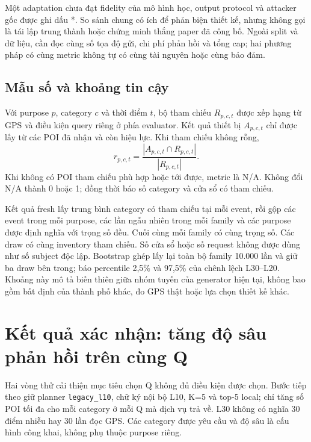 Một adaptation chưa đạt fidelity của mô hình học, output protocol và attacker
gốc được ghi dấu *. So sánh chung có ích để phản biện thiết kế, nhưng không
gọi là tái lập trung thành hoặc chứng minh thắng paper đã công bố. Ngoài split
và dữ liệu, cần đọc cùng số tọa độ gửi, chi phí phản hồi và tổng cap; hai
phương pháp có cùng metric không tự có cùng tài nguyên hoặc cùng bảo đảm.

\subsection{Mẫu số và khoảng tin cậy}

Với purpose $p$, category $c$ và thời điểm $t$, bộ tham chiếu $R_{p,c,t}$ được
xếp hạng từ GPS và điều kiện query riêng ở phía evaluator. Kết quả thiết bị
$A_{p,c,t}$ chỉ được lấy từ các POI đã nhận và còn hiệu lực. Khi tham chiếu
không rỗng,
\begin{equation}
 r_{p,c,t}=\frac{|A_{p,c,t}\cap R_{p,c,t}|}{|R_{p,c,t}|}.
 \label{eq:current-conditional-recall}
\end{equation}
Khi không có POI tham chiếu phù hợp hoặc tới được, metric là N/A. Không đổi
N/A thành 0 hoặc 1; đồng thời báo số category và cửa sổ có tham chiếu.

Kết quả fresh lấy trung bình category có tham chiếu tại mỗi event, rồi gộp các
event trong mỗi purpose, các lần ngẫu nhiên trong mỗi family và các purpose
được định nghĩa với trọng số đều. Cuối cùng mỗi family có cùng trọng số.
Các draw có cùng inventory tham chiếu. Số cửa sổ hoặc số request không được
dùng như số subject độc lập. Bootstrap ghép lấy lại toàn bộ family 10.000 lần
và giữ ba draw bên trong; báo percentile 2,5\% và 97,5\% của chênh lệch L30--L20.
Khoảng này mô tả biến thiên giữa nhóm tuyến của generator hiện tại, không
bao gồm bất định của thành phố khác, đo GPS thật hoặc lựa chọn thiết kế khác.

\section{Kết quả xác nhận: tăng độ sâu phản hồi trên cùng Q}
\label{sec:current-fresh-depth}

Hai vòng thử cải thiện mục tiêu chọn Q không đủ điều kiện được chọn. Bước
tiếp theo giữ planner \texttt{legacy\_l10}, chữ ký nội bộ L10, K=5 và top-5
local; chỉ tăng số POI tối đa cho mỗi category ở mỗi Q mà dịch vụ trả về.
L30 không có nghĩa 30 điểm nhiễu hay 30 lần đọc GPS. Các category được yêu cầu
và độ sâu là cấu hình công khai, không phụ thuộc purpose riêng.

